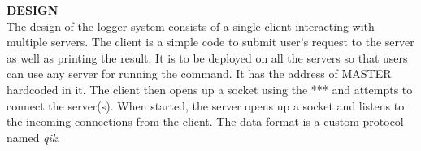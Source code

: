 
\usepackage{graphicx}
\usepackage{amssymb}
\usepackage{amsmath}
\oddsidemargin 0in
\evensidemargin 0in
\textwidth 6.5in
\topmargin -0.5in
\textheight 9.0in




\pagestyle{myheadings}  %

{\centering \large \textbf{DESIGN}} \\
The design of the logger system consists of a single client interacting with multiple servers. The client is a simple code to submit user’s request to the server as well as printing the result.  It is to be deployed on all the servers so that users can use any server for running the command. It has the address of MASTER hardcoded in it. The client then opens up a socket using the *** and attempts to connect the server(s). When started, the server opens up a socket and listens to the incoming connections from the client. The data format is a custom protocol named \textit{qik}.


